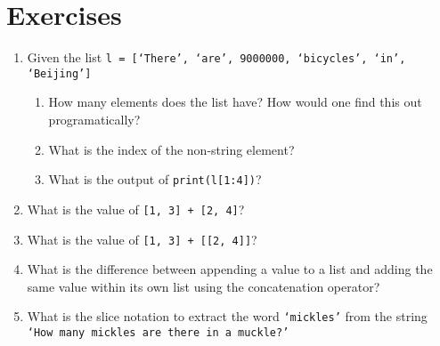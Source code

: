 \section{Exercises}

\begin{enumerate}
\item Given the list 
\texttt{l = [`There', `are', 9000000, `bicycles', `in', `Beijing']}
\begin{enumerate}
	\item How many elements does the list have? How would one find this    out programatically?
	\item What is the index of the non-string element?
	\item What is the output of 
\texttt{print(l[1:4])}?
\end{enumerate}
	\item What is the value of 
\texttt{[1, 3] + [2, 4]}?
	\item What is the value of 
\texttt{[1, 3] + [[2, 4]]}?
	\item What is the difference between appending a value to a list and    adding the same value within its own list using the concatenation    operator?
	\item What is the slice notation to extract the word \texttt{`mickles'} from    the string \texttt{`How many mickles are there in a    muckle?'}
% 
% 
% 
% 


\end{enumerate}
